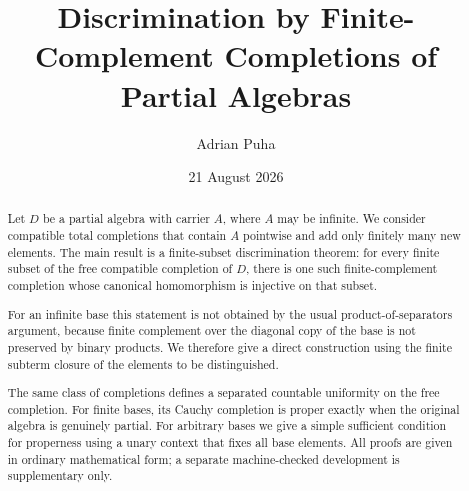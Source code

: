 \documentclass[11pt]{article}
\title{\textbf{Discrimination by Finite-Complement Completions of Partial Algebras}}
\author{Adrian Puha}
\date{21 August 2026}
\begin{document}
\maketitle

\begin{abstract}
Let $D$ be a partial algebra with carrier $A$, where $A$ may be infinite.  We
consider compatible total completions that contain $A$ pointwise and add only
finitely many new elements.  The main result is a finite-subset discrimination
theorem: for every finite subset of the free compatible completion of $D$,
there is one such finite-complement completion whose canonical homomorphism is
injective on that subset.

For an infinite base this statement is not obtained by the usual
product-of-separators argument, because finite complement over the diagonal
copy of the base is not preserved by binary products.  We therefore give a
direct construction using the finite subterm closure of the elements to be
distinguished.

The same class of completions defines a separated countable uniformity on the
free completion.  For finite bases, its Cauchy completion is proper exactly
when the original algebra is genuinely partial.  For arbitrary bases we give a
simple sufficient condition for properness using a unary context that fixes all
base elements.  All proofs are given in ordinary mathematical form; a separate
machine-checked development is supplementary only.
\end{abstract}











\appendix


\begingroup
\small
\setlength{\bibsep}{0.25em}


\endgroup
\end{document}
